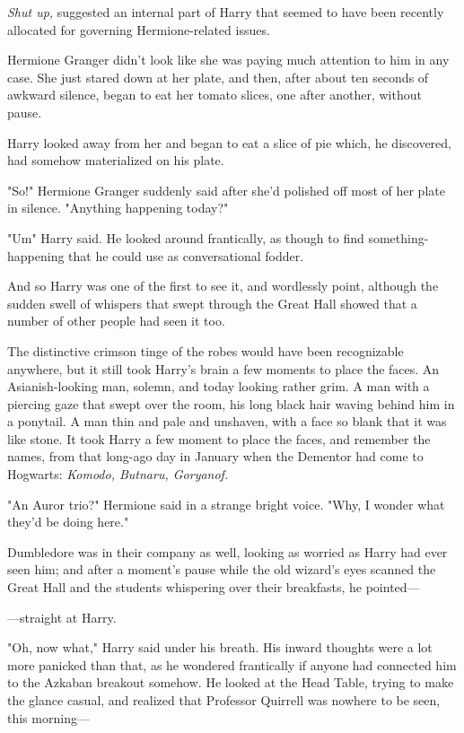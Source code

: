 \emph{Shut up,} suggested an internal part of Harry that seemed to have been
recently allocated for governing Hermione-related issues.

Hermione Granger didn't look like she was paying much attention to him in any
case. She just stared down at her plate, and then, after about ten seconds of
awkward silence, began to eat her tomato slices, one after another, without
pause.

Harry looked away from her and began to eat a slice of pie which, he
discovered, had somehow materialized on his plate.

"So!" Hermione Granger suddenly said after she'd polished off most of her plate
in silence. "Anything happening today?"

"Um{\el}" Harry said. He looked around frantically, as though to find
something-happening that he could use as conversational fodder.

And so Harry was one of the first to see it, and wordlessly point, although the
sudden swell of whispers that swept through the Great Hall showed that a number
of other people had seen it too.

The distinctive crimson tinge of the robes would have been recognizable
anywhere, but it still took Harry's brain a few moments to place the faces. An
Asianish-looking man, solemn, and today looking rather grim. A man with a
piercing gaze that swept over the room, his long black hair waving behind him
in a ponytail. A man thin and pale and unshaven, with a face so blank that it
was like stone. It took Harry a few moment to place the faces, and remember the
names, from that long-ago day in January when the Dementor had come to
Hogwarts: \emph{Komodo, Butnaru, Goryanof.}

"An Auror trio?" Hermione said in a strange bright voice. "Why, I wonder what
they'd be doing here."

Dumbledore was in their company as well, looking as worried as Harry had ever
seen him; and after a moment's pause while the old wizard's eyes scanned the
Great Hall and the students whispering over their breakfasts, he pointed---

---straight at Harry.

"Oh, now what," Harry said under his breath. His inward thoughts were a lot
more panicked than that, as he wondered frantically if anyone had connected him
to the Azkaban breakout somehow. He looked at the Head Table, trying to make
the glance casual, and realized that Professor Quirrell was nowhere to be seen,
this morning---

